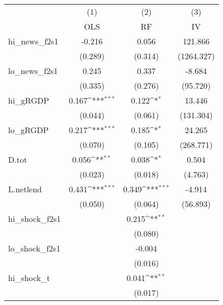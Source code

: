 {
\def\sym#1{\ifmmode^{#1}\else\(^{#1}\)\fi}
\begin{tabular}{l*{3}{c}}
\toprule
            &\multicolumn{1}{c}{(1)}&\multicolumn{1}{c}{(2)}&\multicolumn{1}{c}{(3)}\\
            &\multicolumn{1}{c}{OLS}&\multicolumn{1}{c}{RF}&\multicolumn{1}{c}{IV}\\
\midrule
hi\_news\_f2s1&      -0.216         &       0.056         &     121.866         \\
            &     (0.289)         &     (0.314)         &  (1264.327)         \\
\addlinespace
lo\_news\_f2s1&       0.245         &       0.337         &      -8.684         \\
            &     (0.335)         &     (0.276)         &    (95.720)         \\
\addlinespace
hi\_gRGDP    &       0.167\sym{***}&       0.122\sym{*}  &      13.446         \\
            &     (0.044)         &     (0.061)         &   (131.304)         \\
\addlinespace
lo\_gRGDP    &       0.217\sym{***}&       0.185\sym{*}  &      24.265         \\
            &     (0.070)         &     (0.105)         &   (268.771)         \\
\addlinespace
D.tot       &       0.056\sym{**} &       0.038\sym{*}  &       0.504         \\
            &     (0.023)         &     (0.018)         &     (4.763)         \\
\addlinespace
L.netlend   &       0.431\sym{***}&       0.349\sym{***}&      -4.914         \\
            &     (0.050)         &     (0.064)         &    (56.893)         \\
\addlinespace
hi\_shock\_f2s1&                     &       0.215\sym{**} &                     \\
            &                     &     (0.080)         &                     \\
\addlinespace
lo\_shock\_f2s1&                     &      -0.004         &                     \\
            &                     &     (0.016)         &                     \\
\addlinespace
hi\_shock\_t  &                     &       0.041\sym{**} &                     \\
            &                     &     (0.017)         &                     \\

\end{tabular}}
